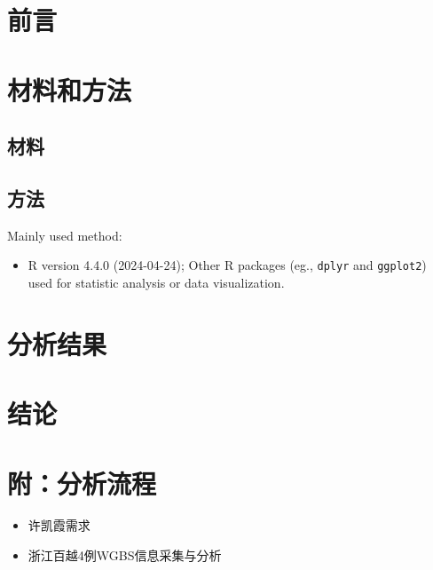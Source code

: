 \documentclass[
]{article}
\providecommand{\tightlist}{%
  \setlength{\itemsep}{0pt}\setlength{\parskip}{0pt}}
\begin{document}
\hypertarget{introduction}{%
\section{前言}\label{introduction}}

\hypertarget{methods}{%
\section{材料和方法}\label{methods}}

\hypertarget{ux6750ux6599}{%
\subsection{材料}\label{ux6750ux6599}}

\hypertarget{ux65b9ux6cd5}{%
\subsection{方法}\label{ux65b9ux6cd5}}

Mainly used method:

\begin{itemize}
\tightlist
\item
  R version 4.4.0 (2024-04-24); Other R packages (eg., \texttt{dplyr} and \texttt{ggplot2}) used for statistic analysis or data visualization.
\end{itemize}

\hypertarget{results}{%
\section{分析结果}\label{results}}

\hypertarget{dis}{%
\section{结论}\label{dis}}

\hypertarget{workflow}{%
\section{附：分析流程}\label{workflow}}

\begin{itemize}
\tightlist
\item
  许凯霞需求
\item
  浙江百越4例WGBS信息采集与分析
\end{itemize}

\begin{center}\vspace{1.5cm}\end{center}
\end{document}
